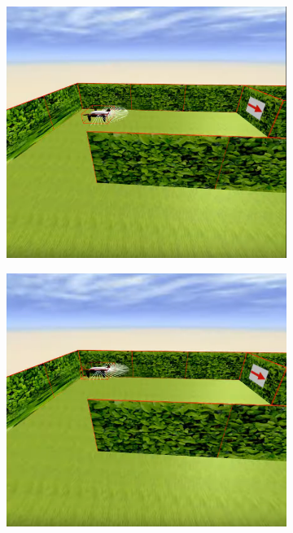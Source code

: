 \begin{figure}[h!]
\begin{subfigure}[b]{0.3\textwidth}
    \includegraphics[width=\textwidth, height=\textwidth]{drone1.png}
  \end{subfigure}
  \hfill
  \hfill
  \begin{subfigure}[b]{0.3\textwidth}
    \includegraphics[width=\textwidth, height=\textwidth]{drone2.png}

\end{subfigure}
\end{figure}
